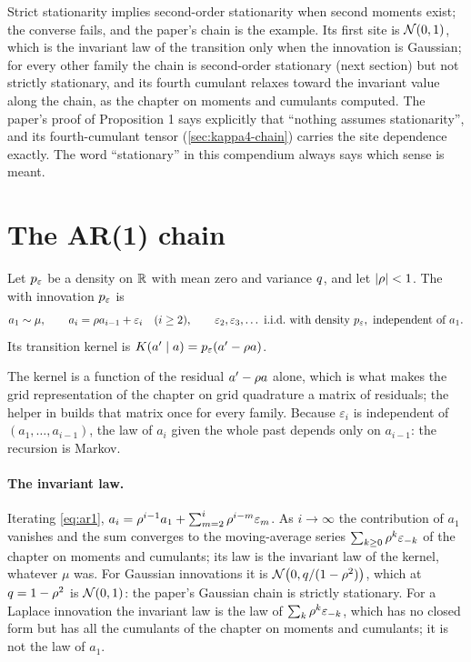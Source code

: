 Strict stationarity implies second-order stationarity when second moments exist; the
converse fails, and the paper's chain is the example. Its first site is $\mathcal{N}\!\left(0,1\right)$,
which is the invariant law of the transition only when the innovation is Gaussian;
for every other family the chain is second-order stationary (next section) but not
strictly stationary, and its fourth cumulant relaxes toward the invariant value along
the chain, as the chapter on moments and cumulants computed. The paper's proof of
Proposition 1 says explicitly that ``nothing assumes stationarity'', and its
fourth-cumulant tensor (\cref{sec:kappa4-chain}) carries the site dependence exactly.
The word ``stationary'' in this compendium always says which sense is meant.

\section{The AR(1) chain}

\begin{definition}
Let $p_{\varepsilon}$ be a density on $\mathbb{R}$ with mean zero and variance $q$, and let
$|\rho|<1$. The  with innovation $p_{\varepsilon}$ is
\begin{equation}
  a_1\sim\mu,\qquad a_i=\rho a_{i-1}+\varepsilon_i\quad(i\ge2),\qquad
  \varepsilon_2,\varepsilon_3,\dots\ \text{i.i.d.\ with density }p_{\varepsilon},\ \text{independent of }a_1 .
  \label{eq:ar1}
\end{equation}
Its transition kernel is $K(a'\mid a)=p_{\varepsilon}(a'-\rho a)$.
\end{definition}

The kernel is a function of the residual $a'-\rho a$ alone, which is what makes the
grid representation of the chapter on grid quadrature a matrix of residuals; the
helper  in  builds that
matrix once for every family. Because
$\varepsilon_i$ is independent of $(a_1,\dots,a_{i-1})$, the law of $a_i$ given the
whole past depends only on $a_{i-1}$: the recursion is Markov.

\paragraph{The invariant law.}
Iterating \cref{eq:ar1}, $a_i=\rho^{i-1}a_1+\sum_{m=2}^i\rho^{i-m}\varepsilon_m$. As
$i\to\infty$ the contribution of $a_1$ vanishes and the sum converges to the
moving-average series $\sum_{k\ge0}\rho^k\varepsilon_{-k}$ of the chapter on moments
and cumulants; its law is the invariant law of the kernel, whatever $\mu$ was. For
Gaussian innovations it is $\mathcal{N}\!\left(0,q/(1-\rho^2)\right)$, which at $q=1-\rho^2$ is
$\mathcal{N}\!\left(0,1\right)$: the paper's Gaussian chain is strictly stationary. For a Laplace
innovation the invariant law is the law of $\sum_k\rho^k\varepsilon_{-k}$, which has no
closed form but has all the cumulants of the chapter on moments and cumulants; it is
not the law of $a_1$.

